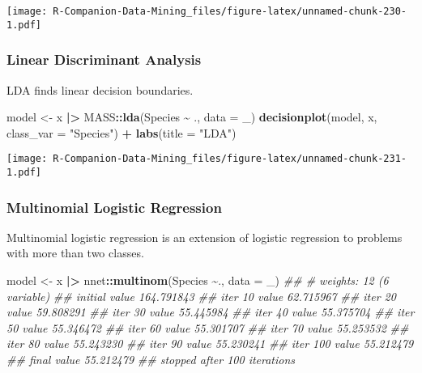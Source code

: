 \documentclass[
  notitlepage]{book}
\newenvironment{Shaded}{\begin{snugshade}}{\end{snugshade}}
\newcommand{\CommentTok}[1]{\textcolor[rgb]{0.56,0.35,0.01}{\textit{#1}}}
\newcommand{\DataTypeTok}[1]{\textcolor[rgb]{0.13,0.29,0.53}{#1}}
\newcommand{\ErrorTok}[1]{\textcolor[rgb]{0.64,0.00,0.00}{\textbf{#1}}}
\newcommand{\KeywordTok}[1]{\textcolor[rgb]{0.13,0.29,0.53}{\textbf{#1}}}
\newcommand{\NormalTok}[1]{#1}
\newcommand{\OperatorTok}[1]{\textcolor[rgb]{0.81,0.36,0.00}{\textbf{#1}}}
\newcommand{\StringTok}[1]{\textcolor[rgb]{0.31,0.60,0.02}{#1}}
\begin{document}
\texttt{[image: R-Companion-Data-Mining\_files/figure-latex/unnamed-chunk-230-1.pdf]}

\hypertarget{linear-discriminant-analysis}{%
\subsubsection{Linear Discriminant Analysis}\label{linear-discriminant-analysis}}

LDA finds linear decision boundaries.

\begin{Shaded}
\begin{Highlighting}[]
\NormalTok{model \textless{}{-}}\StringTok{ }\NormalTok{x }\OperatorTok{|}\ErrorTok{\textgreater{}}\StringTok{ }\NormalTok{MASS}\OperatorTok{::}\KeywordTok{lda}\NormalTok{(Species }\OperatorTok{\textasciitilde{}}\StringTok{ }\NormalTok{., }\DataTypeTok{data =}\NormalTok{ \_)}
\KeywordTok{decisionplot}\NormalTok{(model, x, }\DataTypeTok{class\_var =} \StringTok{"Species"}\NormalTok{) }\OperatorTok{+}\StringTok{ }
\StringTok{  }\KeywordTok{labs}\NormalTok{(}\DataTypeTok{title =} \StringTok{"LDA"}\NormalTok{)}
\end{Highlighting}
\end{Shaded}

\texttt{[image: R-Companion-Data-Mining\_files/figure-latex/unnamed-chunk-231-1.pdf]}

\hypertarget{multinomial-logistic-regression}{%
\subsubsection{Multinomial Logistic Regression}\label{multinomial-logistic-regression}}

Multinomial logistic regression is an extension of logistic regression
to problems with more than two classes.

\begin{Shaded}
\begin{Highlighting}[]
\NormalTok{model \textless{}{-}}\StringTok{ }\NormalTok{x }\OperatorTok{|}\ErrorTok{\textgreater{}}\StringTok{ }\NormalTok{nnet}\OperatorTok{::}\KeywordTok{multinom}\NormalTok{(Species }\OperatorTok{\textasciitilde{}}\NormalTok{., }\DataTypeTok{data =}\NormalTok{ \_)}
\CommentTok{\#\# \# weights:  12 (6 variable)}
\CommentTok{\#\# initial  value 164.791843 }
\CommentTok{\#\# iter  10 value 62.715967}
\CommentTok{\#\# iter  20 value 59.808291}
\CommentTok{\#\# iter  30 value 55.445984}
\CommentTok{\#\# iter  40 value 55.375704}
\CommentTok{\#\# iter  50 value 55.346472}
\CommentTok{\#\# iter  60 value 55.301707}
\CommentTok{\#\# iter  70 value 55.253532}
\CommentTok{\#\# iter  80 value 55.243230}
\CommentTok{\#\# iter  90 value 55.230241}
\CommentTok{\#\# iter 100 value 55.212479}
\CommentTok{\#\# final  value 55.212479 }
\CommentTok{\#\# stopped after 100 iterations}
\end{Highlighting}
\end{Shaded}
\end{document}
